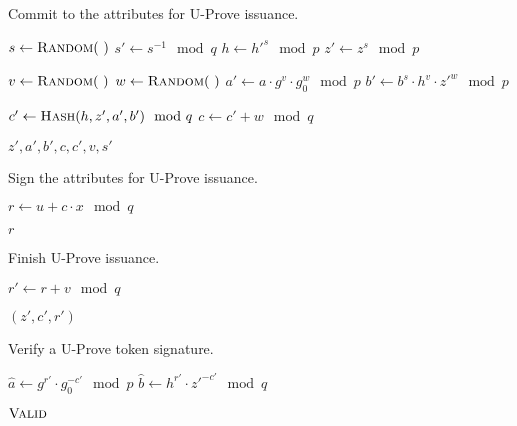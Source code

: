 \begin{algorithm}
  \caption{Commit to the attributes for U-Prove issuance.}
  \label{alg:UP-issuance-commit}
  \addtolength{\baselineskip}{1mm}
  \begin{algorithmic}[1]
      \State $s \gets \Call{Random}{~}$
      \State $s' \gets s^{-1} \mod q$
      \State $h \gets h'^s \mod p$
      \State $z' \gets z^s \mod p$
      
      \State $v \gets \Call{Random}{~}$
      \State $w \gets \Call{Random}{~}$
      \State $a' \gets a \cdot g^v \cdot g_0^w \mod p$
      \State $b' \gets b^s \cdot h^v \cdot z'^w \mod p$
      
      \State $c' \gets \Call{Hash}{h, z', a', b'} \mod q$
      \State $c \gets c' + w \mod q$
      
      \Return $z', a', b', c, c', v, s'$
    \EndFunction
  \end{algorithmic}
\end{algorithm}

\begin{algorithm}
  \caption{Sign the attributes for U-Prove issuance.}
  \label{alg:UP-issuance-blind-sign}
  \addtolength{\baselineskip}{1mm}
  \begin{algorithmic}[1]
      \State $r \gets u + c \cdot x \mod q$

      \Return $r$
    \EndFunction
  \end{algorithmic}
\end{algorithm}

\begin{algorithm}
  \caption{Finish U-Prove issuance.}
  \label{alg:UP-issuance-finish}
  \addtolength{\baselineskip}{1mm}
  \begin{algorithmic}[1]
      \State $r' \gets r + v \mod q$
      
        \Return {}
      \EndIf

      \Return $(z', c', r')$
    \EndFunction
  \end{algorithmic}
\end{algorithm}

\begin{algorithm}
  \caption{Verify a U-Prove token signature.}
  \label{alg:UP-verify-token}
  \addtolength{\baselineskip}{1mm}
  \begin{algorithmic}[1]
      \State $\hat{a} \gets g^{r'} \cdot g_0^{-c'} \mod p$
      \State $\hat{b} \gets h^{r'} \cdot z'^{-c'} \mod q$
        \Return {}
      \EndIf

      \Return $\Call{Valid}{}$
    \EndFunction
  \end{algorithmic}
\end{algorithm}

